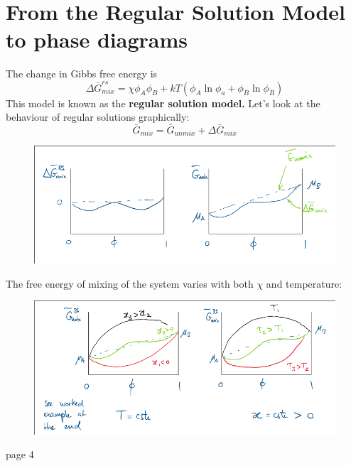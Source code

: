 \documentclass[a4paper, 11pt, normalem]{report}
\begin{document}
\section{From the Regular Solution Model to phase diagrams}
The change in Gibbs free energy is
\begin{equation}
    \Delta\bar{G}_{mix}^{rs} = \chi\phi_A\phi_B + kT(\phi_A\ln\phi_a + \phi_B\ln\phi_B)
\end{equation}
This model is known as the \textbf{regular solution model.}
Let's look at the behaviour of regular solutions graphically:
\begin{equation}
    \bar{G}_{mix} = \bar{G}_{unmix} + \Delta\bar{G}_{mix}
\end{equation}
\begin{figure}[H]
    \centering
    \includegraphics[scale=0.5]{behave.png}
\end{figure}
The free energy of mixing of the system varies with both $\chi$ and temperature:
\begin{figure}[H]
    \centering
    \includegraphics[scale=0.5]{behive.png}
\end{figure}
page 4
\end{document}
